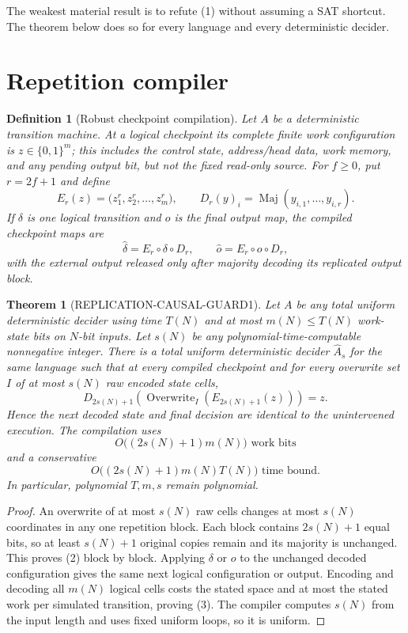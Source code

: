 \documentclass[11pt]{article}
\newtheorem{theorem}{Theorem}
\newtheorem{definition}{Definition}
\begin{document}
The weakest material result is to refute (1) without assuming a SAT shortcut.
The theorem below does so for every language and every deterministic decider.

\section{Repetition compiler}
\begin{definition}[Robust checkpoint compilation]
Let $A$ be a deterministic transition machine.  At a logical checkpoint its
complete finite work configuration is $z\in\{0,1\}^{m}$; this includes the
control state, address/head data, work memory, and any pending output bit, but
not the fixed read-only source.  For $f\ge0$, put $r=2f+1$ and define
\[
 E_r(z)=\bigl(z_1^r,z_2^r,\ldots,z_m^r\bigr),
 \qquad
 D_r(y)_i=\operatorname{Maj}(y_{i,1},\ldots,y_{i,r}).
\]
If $\delta$ is one logical transition and $o$ is the final output map, the
compiled checkpoint maps are
\[
 \widehat\delta=E_r\circ\delta\circ D_r,
 \qquad
 \widehat o=E_r\circ o\circ D_r,
\]
with the external output released only after majority decoding its replicated
output block.
\end{definition}

\begin{theorem}[REPLICATION-CAUSAL-GUARD1]
Let $A$ be any total uniform deterministic decider using time $T(N)$ and at
most $m(N)\le T(N)$ work-state bits on $N$-bit inputs.  Let $s(N)$ be any
polynomial-time-computable nonnegative integer.  There is a total uniform
deterministic decider $\widehat A_s$ for the same language such that at every
compiled checkpoint and for every overwrite set $I$ of at most $s(N)$ raw
encoded state cells,
\[
 D_{2s(N)+1}\!\left(\operatorname{Overwrite}_I
       (E_{2s(N)+1}(z))\right)=z.
 \tag{2}
\]
Hence the next decoded state and final decision are identical to the
unintervened execution.  The compilation uses
\[
 O\bigl((2s(N)+1)m(N)\bigr)\text{ work bits}
\]
and a conservative
\[
 O\bigl((2s(N)+1)m(N)T(N)\bigr)\text{ time bound}.
 \tag{3}
\]
In particular, polynomial $T,m,s$ remain polynomial.
\end{theorem}
\begin{proof}
An overwrite of at most $s(N)$ raw cells changes at most $s(N)$ coordinates
in any one repetition block.  Each block contains $2s(N)+1$ equal bits, so at
least $s(N)+1$ original copies remain and its majority is unchanged.  This
proves (2) block by block.  Applying $\delta$ or $o$ to the unchanged decoded
configuration gives the same next logical configuration or output.  Encoding
and decoding all $m(N)$ logical cells costs the stated space and at most the
stated work per simulated transition, proving (3).  The compiler computes
$s(N)$ from the input length and uses fixed uniform loops, so it is uniform.
\end{proof}
\end{document}
